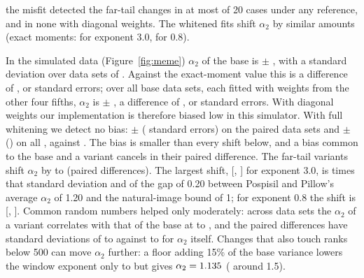 the misfit detected the far-tail changes in at most \MemeFlagMaxN{} of 20 cases under any reference, and in none with diagonal weights. The whitened fits shift $\alpha_2$ by similar amounts (exact moments: \MemeFullShiftThree{} for exponent 3.0, \MemeFullShiftPointEight{} for 0.8).

In the simulated data (Figure~\ref{fig:meme}) $\alpha_2$ of the base is \MemeSimBase{} $\pm$ \MemeSimBaseSE{}, with a standard deviation over data sets of \MemeSimBaseSD{}. Against the exact-moment value \MemeExactBaseDiag{} this is a difference of \MemeSimBaseBias{}, or \MemeSimBaseDiagT{} standard errors; over all \MemeNB{} base data sets, each fitted with weights from the other four fifths, $\alpha_2$ is \MemeNullAlphaDiag{} $\pm$ \MemeNullAlphaDiagSE{}, a difference of \MemeNullAlphaDiagBias{}, or \MemeNullAlphaDiagT{} standard errors. With diagonal weights our implementation is therefore biased low in this simulator. With full whitening we detect no bias: \MemeSimBaseFullMean{} $\pm$ \MemeSimBaseFullSE{} (\MemeSimBaseFullT{} standard errors) on the paired data sets and \MemeNullAlphaFull{} $\pm$ \MemeNullAlphaFullSE{} (\MemeNullAlphaFullT{}) on all \MemeNB{}, against \MemeExactBaseFull{}. The bias is smaller than every shift below, and a bias common to the base and a variant cancels in their paired difference. The far-tail variants shift $\alpha_2$ by \MemeSimDiffMin{} to \MemeSimDiffMax{} (paired differences). The largest shift, \MemeSimDiffThree{} [\MemeSimDiffThreeLo{}, \MemeSimDiffThreeHi{}] for exponent 3.0, is \MemeRatioThreeSD{} times that standard deviation and \MemeRatioThreeGap{} of the gap of 0.20 between Pospisil and Pillow's average $\alpha_2$ of 1.20 and the natural-image bound of 1; for exponent 0.8 the shift is \MemeSimDiffPointEight{} [\MemeSimDiffPointEightLo{}, \MemeSimDiffPointEightHi{}]. Common random numbers helped only moderately: across data sets the $\alpha_2$ of a variant correlates with that of the base at \MemeCorrMin{} to \MemeCorrMax{}, and the paired differences have standard deviations of \MemePairedSDMin{} to \MemePairedSDMax{} against \MemeSimSDMin{} to \MemeSimSDMax{} for $\alpha_2$ itself. Changes that also touch ranks below 500 can move $\alpha_2$ further: a floor adding 15\% of the base variance lowers the window exponent only to \MemeFloorWinA{} but gives $\alpha_2 = 1.135{}$ (\MemeFloorB{} around 1.5).

